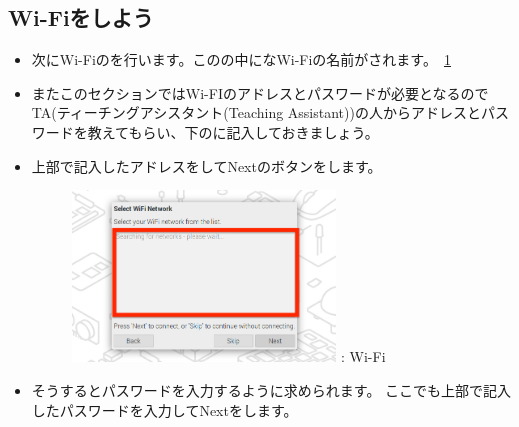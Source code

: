 \documentclass[a4paper,12pt]{jarticle}
\begin{document}
\begin{enumerate}
    \subsection{\theExercise Wi-Fiをしよう}
                \begin{itemize}
                  \item
                        次にWi-Fiのを行います。このの中になWi-Fiの名前がされます。~\ref{seq:refFigure16}
                        \item
                        \theQuestion またこのセクションではWi-FIのアドレスとパスワードが必要となるのでTA(ティーチングアシスタント(Teaching Assistant))の人からアドレスとパスワードを教えてもらい、下のに記入しておきましょう。
                        \item
                        上部で記入したアドレスをしてNextのボタンをします。
                        \begin{figure}[h]
                          \centering
                          \begin{minipage}{5.228cm}
                            {\upshape
                              \includegraphics[width=7.000cm]{sw_image06kai.png}
                              \newline
                              {\theFigure\label{seq:refFigure16}}:
                              Wi-Fi}
                          \end{minipage}
                        \end{figure}
                \end{itemize}
                \begin{itemize}
                  \item
                      そうするとパスワードを入力するように求められます。 ここでも上部で記入したパスワードを入力してNextをします。

\end{itemize}
\end{enumerate}
\end{document}
